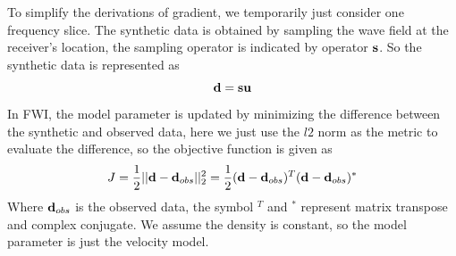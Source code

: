 \documentclass[revised,endfloat]{geophysics}
\begin{document}
To simplify the derivations of gradient, we temporarily just consider one frequency slice. The synthetic data is obtained by sampling the wave field at the receiver's location, the sampling operator is indicated by operator ${\bf s}$. So the synthetic data is represented as 
\begin{equation}
{\bf d = su}
\label{eq126}
\end{equation}
In FWI, the model parameter is updated by minimizing the difference between the synthetic and observed data, here we just use the $l2$ norm as the metric to evaluate the difference, so the objective function is given as 
\begin{equation}
J = \frac{1}{2}||{\bf d} - {\bf d}_{obs}||_2^2 = \frac{1}{2}({\bf d} - {\bf d}_{obs})^T ({\bf d} - {\bf d}_{obs})^*
\label{eq127}
\end{equation}
Where ${\bf d}_{obs}$ is the observed data, the symbol $^T$ and $^*$ represent matrix transpose and complex conjugate. We assume the density is constant, so the model parameter is just the velocity model.
\end{document}
